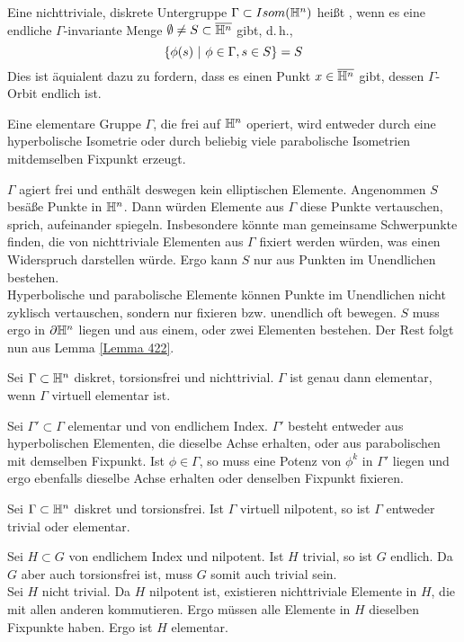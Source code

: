 \documentclass{book}
\begin{document}
\begin{Beweis}{}
\end{Beweis}

\Def{}
Eine nichttriviale, diskrete Untergruppe $\Gamma \subset Isom(\mathbb{H}^n)$ heißt , wenn es eine endliche $\Gamma$-invariante Menge $\emptyset \neq S \subset \overline{\mathbb{H}^n}$ gibt, d.\,h.,
\[ \set{\phi(s) }{\phi \in \Gamma, s\in S} = S \]
Dies ist äquialent dazu zu fordern, dass es einen Punkt $x \in \overline{\mathbb{H}^n}$ gibt, dessen $\Gamma$-Orbit endlich ist.

\Prop{}
Eine elementare Gruppe $\Gamma$, die frei auf $\mathbb{H}^n$ operiert, wird entweder durch eine hyperbolische Isometrie oder durch beliebig viele parabolische Isometrien mitdemselben Fixpunkt erzeugt.
\begin{Beweis}{}
$\Gamma$ agiert frei und enthält deswegen kein elliptischen Elemente. Angenommen $S$ besäße Punkte in $\mathbb{H}^n$. Dann würden Elemente aus $\Gamma$ diese Punkte vertauschen, sprich, aufeinander spiegeln. Insbesondere könnte man gemeinsame Schwerpunkte finden, die von nichttriviale Elementen aus $\Gamma$ fixiert werden würden, was einen Widerspruch darstellen würde. Ergo kann $S$ nur aus Punkten im Unendlichen bestehen.\\
Hyperbolische und parabolische Elemente können Punkte im Unendlichen nicht zyklisch vertauschen, sondern nur fixieren bzw. unendlich oft bewegen. $S$ muss ergo in $\partial \mathbb{H}^n$ liegen und aus einem, oder zwei Elementen bestehen. Der Rest folgt nun aus Lemma \ref{Lemma 422}.
\end{Beweis}

\Prop{}
Sei $\Gamma \subset \mathbb{H}^n$ diskret, torsionsfrei und nichttrivial. $\Gamma$ ist genau dann elementar, wenn $\Gamma$ virtuell elementar ist.
\begin{Beweis}{}
	Sei $\Gamma' \subset \Gamma$ elementar und von endlichem Index. $\Gamma'$ besteht entweder aus hyperbolischen Elementen, die dieselbe Achse erhalten, oder aus parabolischen mit demselben Fixpunkt. Ist $\phi \in \Gamma$, so muss eine Potenz von $\phi^k$ in $\Gamma'$ liegen und ergo ebenfalls dieselbe Achse erhalten oder denselben Fixpunkt fixieren.
\end{Beweis}

\Kor{}
Sei $\Gamma \subset \mathbb{H}^n$ diskret und torsionsfrei. Ist $\Gamma $ virtuell nilpotent, so ist $\Gamma$ entweder trivial oder elementar.
\begin{Beweis}{}
	Sei $H \subset G$ von endlichem Index und nilpotent. Ist $H$ trivial, so ist $G$ endlich. Da $G$ aber auch torsionsfrei ist, muss $G$ somit auch trivial sein.\\
	Sei $H$ nicht trivial. Da $H$ nilpotent ist, existieren nichttriviale Elemente in $H$, die mit allen anderen kommutieren. Ergo müssen alle Elemente in $H$ dieselben Fixpunkte haben. Ergo ist $H$ elementar.
\end{Beweis}
\end{document}
